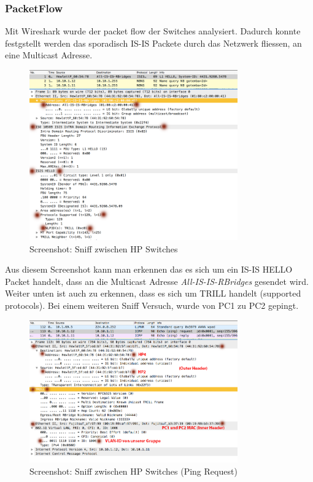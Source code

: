 \documentclass[a4,12pt]{scrartcl}
\begin{document}
\subsubsection{PacketFlow}
Mit Wireshark wurde der packet flow der Switches analysiert. Dadurch konnte festgstellt werden das sporadisch IS-IS Packete durch das Netzwerk fliessen, an eine Multicast Adresse. 
\begin{figure} [H]
	\begin{center}
	\includegraphics[width=0.80\textwidth]{./pictures/capture_isis.png}
	\caption{Screenshot: Sniff zwischen HP Switches}
	\label{x}
	\end{center}
\end{figure}
\noindent Aus diesem Screenshot kann man erkennen das es sich um ein IS-IS HELLO Packet handelt, dass an die Multicast Adresse \textit{All-IS-IS-RBridges} gesendet wird. Weiter unten ist auch zu erkennen, dass es sich um TRILL handelt (supported protocols). 
\newpage
Bei einem weiteren Sniff Versuch, wurde von PC1 zu PC2 gepingt. 
\begin{figure} [H]
	\begin{center}
	\includegraphics[width=0.80\textwidth]{./pictures/capture_ping.png}
	\caption{Screenshot: Sniff zwischen HP Switches (Ping Request)}
	\label{x}
	\end{center}
\end{figure}
\end{document}
